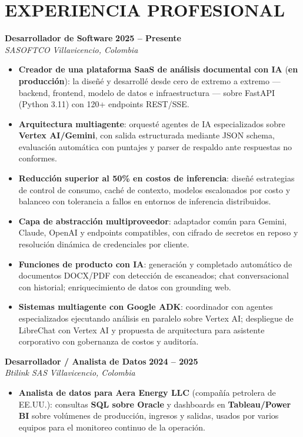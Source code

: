 \documentclass[letterpaper,10pt]{article}
\begin{document}
\section{EXPERIENCIA PROFESIONAL}

\textbf{Desarrollador de Software} \hfill \textbf{2025 -- Presente} \\
\textit{SASOFTCO} \hfill \textit{Villavicencio, Colombia}
\begin{itemize}
    \item \textbf{Creador de una plataforma SaaS de análisis documental con IA} (\textbf{en producción}): la diseñé y desarrollé desde cero de extremo a extremo — backend, frontend, modelo de datos e infraestructura — sobre FastAPI (Python 3.11) con 120+ endpoints REST/SSE.
    \item \textbf{Arquitectura multiagente}: orquesté agentes de IA especializados sobre \textbf{Vertex AI/Gemini}, con salida estructurada mediante JSON schema, evaluación automática con puntajes y parser de respaldo ante respuestas no conformes.
    \item \textbf{Reducción superior al 50\% en costos de inferencia}: diseñé estrategias de control de consumo, caché de contexto, modelos escalonados por costo y balanceo con tolerancia a fallos en entornos de inferencia distribuidos.
    \item \textbf{Capa de abstracción multiproveedor}: adaptador común para Gemini, Claude, OpenAI y endpoints compatibles, con cifrado de secretos en reposo y resolución dinámica de credenciales por cliente.
    \item \textbf{Funciones de producto con IA}: generación y completado automático de documentos DOCX/PDF con detección de escaneados; chat conversacional con historial; enriquecimiento de datos con grounding web.
    \item \textbf{Sistemas multiagente con Google ADK}: coordinador con agentes especializados ejecutando análisis en paralelo sobre Vertex AI; despliegue de LibreChat con Vertex AI y propuesta de arquitectura para asistente corporativo con gobernanza de costos y auditoría.
\end{itemize}

\textbf{Desarrollador / Analista de Datos} \hfill \textbf{2024 -- 2025} \\
\textit{Btilink SAS} \hfill \textit{Villavicencio, Colombia}
\begin{itemize}
    \item \textbf{Analista de datos para Aera Energy LLC} (compañía petrolera de EE.UU.): consultas \textbf{SQL sobre Oracle} y dashboards en \textbf{Tableau/Power BI} sobre volúmenes de producción, ingresos y salidas, usados por varios equipos para el monitoreo continuo de la operación.
\end{itemize}
\end{document}
